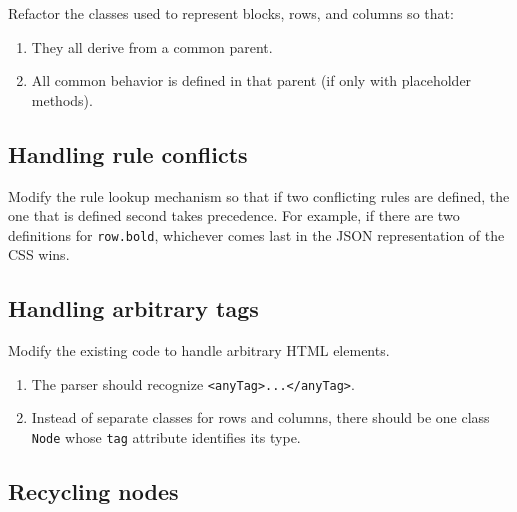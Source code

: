 \documentclass[krantzl]{krantz}
\begin{document}
Refactor the classes used to represent blocks, rows, and columns so that:

\begin{enumerate}

\item 

They all derive from a common parent.



\item 

All common behavior is defined in that parent (if only with placeholder methods).



\end{enumerate}

\subsection*{Handling rule conflicts}


Modify the rule lookup mechanism so that if two conflicting rules are defined,
the one that is defined second takes precedence.
For example,
if there are two definitions for \texttt{row.bold},
whichever comes last in the JSON representation of the CSS wins.

\subsection*{Handling arbitrary tags}


Modify the existing code to handle arbitrary HTML elements.

\begin{enumerate}

\item 

The parser should recognize \texttt{<anyTag>...</anyTag>}.



\item 

Instead of separate classes for rows and columns,
    there should be one class \texttt{Node} whose \texttt{tag} attribute identifies its type.



\end{enumerate}

\subsection*{Recycling nodes}
\end{document}
